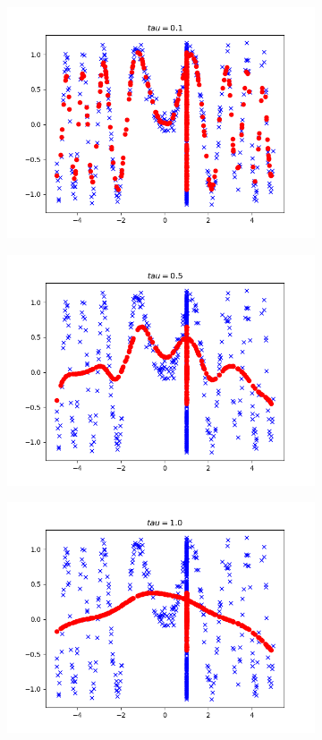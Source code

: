 \begin{answer}
\begin{figure}[htbp]
\begin{subfigure}[b]{0.5\linewidth}
        \includegraphics[width=\linewidth]{pics/tau_0d1}
    \end{subfigure}
    \begin{subfigure}[b]{0.5\linewidth}
        \centering
        \includegraphics[width=\linewidth]{pics/tau_0d5}
    \end{subfigure}
    \begin{subfigure}[b]{0.5\linewidth}
        \centering
        \includegraphics[width=\linewidth]{pics/tau_1d0}

\end{subfigure}
\end{figure}
\end{answer}
